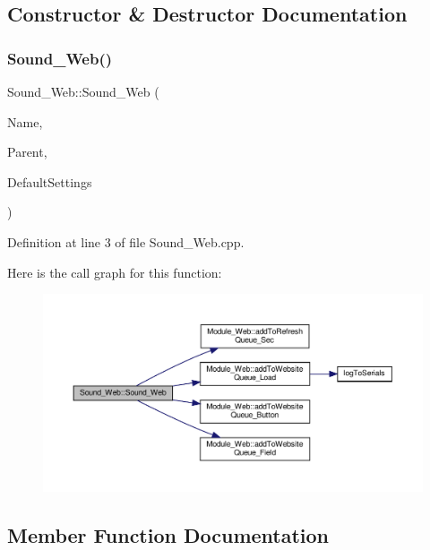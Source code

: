 \subsection{Constructor \& Destructor Documentation}
\mbox{\label{class_sound___web_a986e9542148fc1fe9b803ea4edc17235}} 
\subsubsection{\texorpdfstring{Sound\+\_\+\+Web()}{Sound\_Web()}}
{\footnotesize\ttfamily Sound\+\_\+\+Web\+::\+Sound\+\_\+\+Web (\begin{DoxyParamCaption}\item[{const \+\_\+\+\_\+\+Flash\+String\+Helper $\ast$}]{Name,  }\item[{\hyperlink{class_module___web}{Module\+\_\+\+Web} $\ast$}]{Parent,  }\item[{\hyperlink{struct_settings_1_1_sound_settings}{Settings\+::\+Sound\+Settings} $\ast$}]{Default\+Settings }\end{DoxyParamCaption})}



Definition at line 3 of file Sound\+\_\+\+Web.\+cpp.

Here is the call graph for this function\+:
\nopagebreak
\begin{figure}[H]
\begin{center}
\leavevmode
\includegraphics[width=350pt]{class_sound___web_a986e9542148fc1fe9b803ea4edc17235_cgraph}
\end{center}
\end{figure}


\subsection{Member Function Documentation}
\mbox{\label{class_sound___web_ab55e679fab59cd3fae2b7900d31a0893}} 
